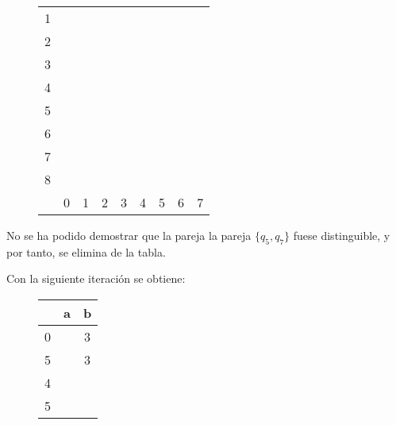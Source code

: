 \documentclass[11pt,a4paper]{article}
\begin{document}
		\begin{figure}[H]
			\centering
			\begin{tabular}{*{9}{c|}}
																							\cline{2-2}
				1 & \color{blue}{X}															\\ \cline{2-3}
				2 & \color{blue}{X} &														\\ \cline{2-4}
				3 & \color{blue}{X} & &											\\ \cline{2-5}
				4 & & \color{blue}{X} & \color{blue}{X} & \color{blue}{X}	\\ \cline{2-6}
				5 & & \color{blue}{X} & \color{blue}{X} & \color{blue}{X} & \\ \cline{2-7}
				6 & \color{red}{X} & \color{blue}{X} & \color{blue}{X} & \color{blue}{X} &
				  & \color{red}{X} \\ \cline{2-8}
				7 & \color{red}{X} & \color{blue}{X} & \color{blue}{X} & \color{blue}{X} & \color{red}{X} & 
				  & \color{red}{X} \\ \cline{2-9}
				8 & \color{blue}{X} & \color{red}{X} & \color{red}{X} & \color{red}{X} & \color{blue}{X} & \color{blue}{X} &
					\color{blue}{X} & \color{blue}{X} \\ \cline{2-9}
				\multicolumn{0}{c}{} & \multicolumn{1}{c}{0} & \multicolumn{1}{c}{1} & \multicolumn{1}{c}{2}
				& \multicolumn{1}{c}{3} & \multicolumn{1}{c}{4} & \multicolumn{1}{c}{5} & \multicolumn{1}{c}{6}
				& \multicolumn{1}{c}{7}
			\end{tabular}
		\end{figure}
		
		No se ha podido demostrar que la pareja  la pareja $\{q_5, q_7\}$ fuese distinguible, y por tanto, se elimina
		de la tabla. \par
		
		Con la siguiente iteración se obtiene:
		
		\begin{figure}[H]
			\centering
			\begin{tabular}{c|cc}
				& a & b		\\ \hline
				0 & \color{red}{1} & 3	\\
				5 & \color{red}{6} & 3	\\ \hline
				4 & \color{red}{1} & \color{red}{5}	\\
				5 & \color{red}{6} & \color{red}{3}	\\ \hline	
			\end{tabular}
		\end{figure}
		
\end{document}
